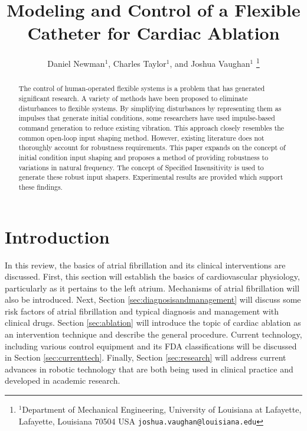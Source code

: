 \documentclass[letterpaper,10pt,conference]{ieeeconf}   %
\begin{document}
\title{\LARGE \bf Modeling and Control of a Flexible Catheter for Cardiac Ablation}

\author{Daniel Newman$^{1}$, Charles Taylor$^{1}$, and Joshua Vaughan$^{1}$%
\thanks{$^{1}$Department of Mechanical Engineering,
        University of Louisiana at Lafayette, Lafayette, Louisiana 70504 USA
        {\tt\small joshua.vaughan@louisiana.edu}}%
}

    
\maketitle

\begin{abstract}
The control of human-operated flexible systems is a problem that has generated significant research. A variety of methods have been proposed to eliminate disturbances to flexible systems. By simplifying disturbances by representing them as impulses that generate initial conditions, some researchers have used impulse-based command generation to reduce existing vibration. This approach closely resembles the common open-loop input shaping method. However, existing literature does not thoroughly account for robustness requirements. This paper expands on the concept of initial condition input shaping and proposes a method of providing robustness to variations in natural frequency. The concept of Specified Insensitivity is used to generate these robust input shapers. Experimental results are provided which support these findings.
\end{abstract}


\section{Introduction}
\label{sec:intro}

In this review, the basics of atrial fibrillation and its clinical interventions are discussed. First, this section will establish the basics of cardiovascular physiology, particularly as it pertains to the left atrium. Mechanisms of atrial fibrillation will also be introduced. Next, Section \ref{sec:diagnosisandmanagement} will discuss some risk factors of atrial fibrillation and typical diagnosis and management with clinical drugs. Section \ref{sec:ablation} will introduce the topic of cardiac ablation as an intervention technique and describe the general procedure. Current technology, including various control equipment and its FDA classifications will be discussed in Section \ref{sec:currenttech}. Finally, Section \ref{sec:research} will address current advances in robotic technology that are both being used in clinical practice and developed in academic research.
\end{document}
